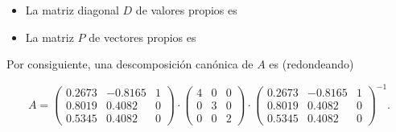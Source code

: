 \documentclass[
]{book}
\newenvironment{Shaded}{\begin{snugshade}}{\end{snugshade}}
\newcommand{\CommentTok}[1]{\textcolor[rgb]{0.56,0.35,0.01}{\textit{#1}}}
\newcommand{\KeywordTok}[1]{\textcolor[rgb]{0.13,0.29,0.53}{\textbf{#1}}}
\newcommand{\NormalTok}[1]{#1}
\newcommand{\OperatorTok}[1]{\textcolor[rgb]{0.81,0.36,0.00}{\textbf{#1}}}
\providecommand{\tightlist}{%
  \setlength{\itemsep}{0pt}\setlength{\parskip}{0pt}}
\theoremstyle{definition}
\theoremstyle{definition}
\theoremstyle{definition}
\theoremstyle{remark}
\begin{document}
\begin{itemize}
\tightlist
\item
  La matriz diagonal \(D\) de valores propios es
\end{itemize}

\begin{Shaded}
\end{Shaded}

\begin{itemize}
\tightlist
\item
  La matriz \(P\) de vectores propios es
\end{itemize}

\begin{Shaded}
\end{Shaded}

Por consiguiente, una descomposición canónica de \(A\) es (redondeando)

\[
A=\left(\begin{array}{ccc}
0.2673 & -0.8165 & 1\\
0.8019 & 0.4082 & 0\\
0.5345 & 0.4082 & 0
\end{array}
\right)\!\cdot\!
\left(\begin{array}{ccc}
4 & 0 & 0 \\ 0 & 3 & 0\\ 0 & 0 & 2 \end{array}
\right)\!\cdot\!
\left(\begin{array}{ccc}
0.2673 & -0.8165 & 1\\
0.8019 & 0.4082 & 0\\
0.5345 & 0.4082 & 0
\end{array}
\right)^{-1}.
\]
\end{document}
